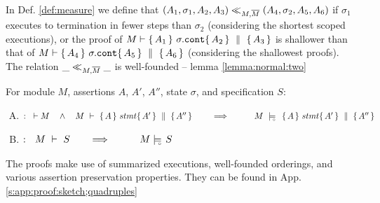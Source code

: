 \label{sect:prove:wellfounded}
\label{sect:prove:sound:quadruples}

In Def.  \ref{def:measure}  we define that $(A_1,\sigma_1,A_2, A_3) \ll_{M,\overline{M}}  (A_4,\sigma_2,A_5, A_6)$ if $\sigma_1$ executes to termination  in fewer steps than $\sigma_2$ (considering the shortest scoped executions), or  the proof of $M \vdash  \{\, A_1 \, \}\ \sigma.\mbox{\normalfont{\texttt{cont}}} \{\, A_2 \, \} \, \,\parallel\,\, \{\, A_3 \, \}  $
is shallower than that of  $M \vdash  \{\, A_4 \, \}\ \sigma.\mbox{\normalfont{\texttt{cont}}} \{\, A_5 \, \} \, \,\parallel\,\, \{\, A_6 \, \}  $ (considering the shallowest proofs).  
The relation $\_ \ll_{M,\overline{M}}  \_$  is well-founded -- \cf lemma \ref{lemma:normal:two}
 

\begin{theorem}
\label{t:quadruple:sound}
\label{thm:soundness}
For module  $M$,   assertions $A$, $A'$, $A''$,   state  $\sigma$, and specification $S$:

\begin{enumerate}[(A)]
\item
 $:\strut \   \vdash M  \ \ \ \wedge \ \ \  M\ \vdash\  \quadruple {A} {stmt} {A'} {A''}  \ \ \ \ \ \ \ \Longrightarrow \ \ \ \ \ \  \ \ \  M\ \modelsD\  \quadruple {A} {stmt} {A'} {A''}$
 \item
  $:\strut \  \  \proves{M}{S}\ \ \ \ \ \ \Longrightarrow\ \ \ \ \ \  \ \ \ {M} \modelsD {S}$
 
\end{enumerate}

\end{theorem}

The proofs make use of summarized executions, well-founded orderings, and various assertion preservation properties. They can be found in App. \ref{s:app:proof:sketch;quadruples}
%
% 
%

